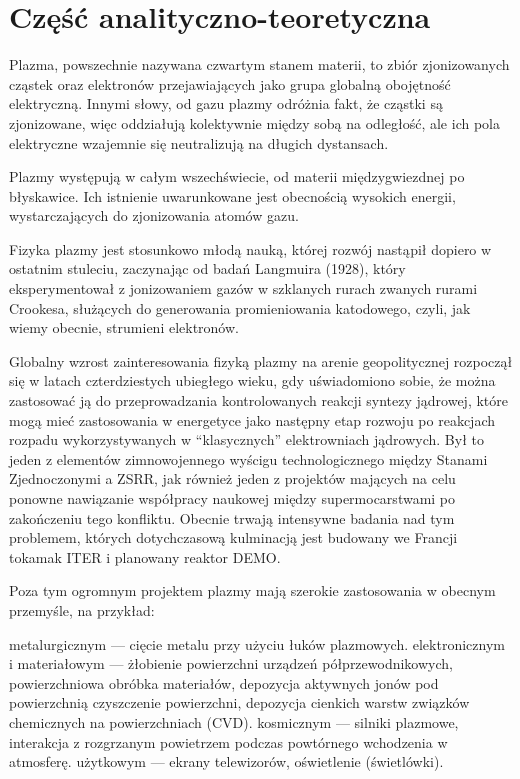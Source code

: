 \section[Część analityczno-teoretyczna]{Część analityczno-teoretyczna}\label{sec:theory} %
    Plazma, powszechnie nazywana czwartym stanem materii, to zbiór
    zjonizowanych cząstek oraz elektronów przejawiających jako grupa globalną
    obojętność elektryczną. Innymi słowy, od gazu plazmy odróżnia fakt, że
    cząstki są zjonizowane, więc oddziałują kolektywnie między sobą na
    odległość, ale ich pola elektryczne wzajemnie się neutralizują na długich
    dystansach.

    Plazmy występują w całym wszechświecie, od materii międzygwiezdnej po
    błyskawice.  Ich istnienie uwarunkowane jest obecnością wysokich energii,
    wystarczających do zjonizowania atomów gazu.

    Fizyka plazmy jest stosunkowo młodą nauką, której rozwój nastąpił dopiero w
    ostatnim stuleciu, zaczynając od badań Langmuira (1928), który
    eksperymentował z jonizowaniem gazów w szklanych rurach zwanych rurami
    Crookesa, służących do generowania promieniowania katodowego, czyli, jak
    wiemy obecnie, strumieni elektronów.

    Globalny wzrost zainteresowania fizyką plazmy na arenie geopolitycznej
    rozpoczął się w latach czterdziestych ubiegłego wieku, gdy uświadomiono sobie,
    że można zastosować ją do przeprowadzania kontrolowanych reakcji syntezy
    jądrowej,
    które mogą mieć zastosowania w energetyce jako następny etap rozwoju po
    reakcjach rozpadu wykorzystywanych w ``klasycznych'' elektrowniach jądrowych.
    Był to jeden z elementów zimnowojennego wyścigu technologicznego między Stanami
    Zjednoczonymi a ZSRR, jak również jeden z projektów mających na celu ponowne
    nawiązanie współpracy naukowej między supermocarstwami po zakończeniu tego
    konfliktu. Obecnie trwają intensywne badania nad tym problemem, których
    dotychczasową kulminacją jest budowany we Francji tokamak ITER i planowany reaktor DEMO\@.

    Poza tym ogromnym projektem plazmy mają szerokie zastosowania w obecnym
    przemyśle, na przykład:
    \begin{itemize}
        \itemi{} metalurgicznym --- cięcie metalu przy użyciu łuków plazmowych.
        \itemi{} elektronicznym i materiałowym --- żłobienie powierzchni urządzeń
            półprzewodnikowych, powierzchniowa obróbka materiałów, depozycja
            aktywnych jonów pod powierzchnią czyszczenie powierzchni, depozycja
            cienkich warstw związków chemicznych na powierzchniach (CVD).
        \itemi{} kosmicznym --- silniki plazmowe, interakcja z rozgrzanym powietrzem
            podczas powtórnego wchodzenia w atmosferę.
        \itemi{} użytkowym --- ekrany telewizorów, oświetlenie (świetlówki).
    \end{itemize}

